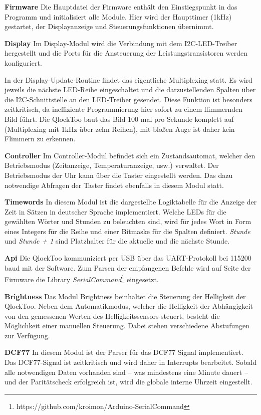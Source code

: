 \begin{multicols}{2}
\textbf{Firmware}
Die Hauptdatei der Firmware enthält den Einstiegspunkt in das Programm und initialisiert alle Module. Hier wird der Haupttimer (1kHz) gestartet, der Displayanzeige und Steuerungsfunktionen übernimmt.

\textbf{Display}
Im Display-Modul wird die Verbindung mit dem I2C-LED-Treiber hergestellt und die Ports für die Ansteuerung der Leistungstransistoren werden konfiguriert.

In der Display-Update-Routine findet das eigentliche Multiplexing statt. Es wird jeweils die nächste LED-Reihe eingeschaltet und die darzustellenden Spalten über die I2C-Schnittstelle an den LED-Treiber gesendet.
Diese Funktion ist besonders zeitkritisch, da ineffiziente Programmierung hier sofort zu einem flimmernden Bild führt.
Die QlockToo baut das Bild 100 mal pro Sekunde komplett auf (Multiplexing mit 1kHz über zehn Reihen), mit bloßen Auge ist daher kein Flimmern zu erkennen.

\textbf{Controller}
Im Controller-Modul befindet sich ein Zustandsautomat, welcher den Betriebsmodus (Zeitanzeige, Temperaturanzeige, usw.) verwaltet.
Der Betriebsmodus der Uhr kann über die Taster eingestellt werden. Das dazu notwendige Abfragen der Taster findet ebenfalls in diesem Modul statt.

\textbf{Timewords}
In diesem Modul ist die dargestellte Logiktabelle für die Anzeige der Zeit in Sätzen in deutscher Sprache implementiert.
Welche LEDs für die gewählten Wörter und Stunden zu beleuchten sind, wird für jedes Wort in Form eines Integers für die Reihe und einer Bitmaske für die Spalten definiert. \emph{Stunde} und \emph{Stunde + 1} sind Platzhalter für die aktuelle und die nächste Stunde.

\textbf{Api}
Die QlockToo kommuniziert per USB über das UART-Protokoll bei 115200 baud mit der Software.
Zum Parsen der empfangenen Befehle wird auf Seite der Firmware die Library \emph{SerialCommand}\footnote{https://github.com/kroimon/Arduino-SerialCommand} eingesetzt.

\textbf{Brightness}
Das Modul Brightness beinhaltet die Steuerung der Helligkeit der QlockToo. Neben dem Automatikmodus, welcher die Helligkeit der Abhängigkeit von den gemessenen Werten des Helligkeitssensors steuert, besteht die Möglichkeit einer manuellen Steuerung. Dabei stehen verschiedene Abstufungen zur Verfügung.

\textbf{DCF77}
In diesem Modul ist der Parser für das DCF77 Signal implementiert. Das DCF77-Signal ist zeitkritisch und wird daher in Interrupts bearbeitet.
Sobald alle notwendigen Daten vorhanden sind -- was mindestens eine Minute dauert -- und der Paritätscheck erfolgreich ist, wird die globale interne Uhrzeit eingestellt.


\end{multicols}
